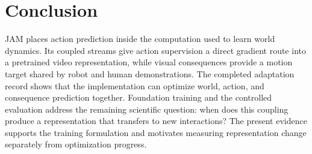 \section{Conclusion}
JAM places action prediction inside the computation used to learn world dynamics. Its coupled
streams give action supervision a direct gradient route into a pretrained video representation,
while visual consequences provide a motion target shared by robot and human demonstrations. The
completed adaptation record shows that the implementation can optimize world, action, and
consequence prediction together. Foundation training and the controlled evaluation address the
remaining scientific question: when does this coupling produce a representation that transfers to
new interactions? The present evidence supports the training formulation and motivates measuring
representation change separately from optimization progress.
